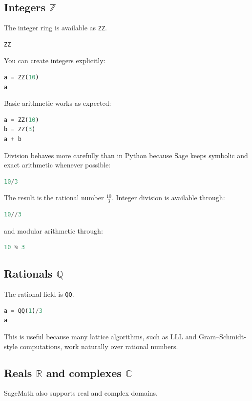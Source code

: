\subsection{Integers $\mathbb{Z}$}
The integer ring is available as \texttt{ZZ}.

\begin{lstlisting}[language=Python]
ZZ
\end{lstlisting}

You can create integers explicitly:

\begin{lstlisting}[language=Python]
a = ZZ(10)
a
\end{lstlisting}

Basic arithmetic works as expected:

\begin{lstlisting}[language=Python]
a = ZZ(10)
b = ZZ(3)
a + b
\end{lstlisting}

Division behaves more carefully than in Python because Sage keeps symbolic and exact arithmetic whenever possible:

\begin{lstlisting}[language=Python]
10/3
\end{lstlisting}

The result is the rational number $\frac{10}{3}$. Integer division is available through:

\begin{lstlisting}[language=Python]
10//3
\end{lstlisting}

and modular arithmetic through:

\begin{lstlisting}[language=Python]
10 % 3
\end{lstlisting}

\subsection{Rationals $\mathbb{Q}$}
The rational field is \texttt{QQ}.

\begin{lstlisting}[language=Python]
a = QQ(1)/3
a
\end{lstlisting}

This is useful because many lattice algorithms, such as LLL and Gram--Schmidt-style computations, work naturally over rational numbers.

\subsection{Reals $\mathbb{R}$ and complexes $\mathbb{C}$}
SageMath also supports real and complex domains.

